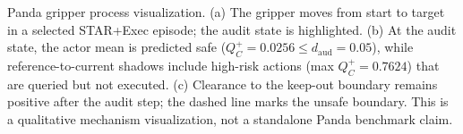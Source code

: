 Panda gripper process visualization. (a) The gripper moves from start to target in a selected STAR+Exec episode; the audit state is highlighted. (b) At the audit state, the actor mean is predicted safe ($Q_C^+=0.0256 \le d_\mathrm{aud}=0.05$), while reference-to-current shadows include high-risk actions (max $Q_C^+=0.7624$) that are queried but not executed. (c) Clearance to the keep-out boundary remains positive after the audit step; the dashed line marks the unsafe boundary. This is a qualitative mechanism visualization, not a standalone Panda benchmark claim.
